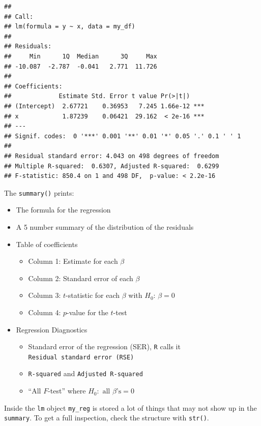 \documentclass[]{book}
\providecommand{\tightlist}{%
  \setlength{\itemsep}{0pt}\setlength{\parskip}{0pt}}
\theoremstyle{definition}
\theoremstyle{definition}
\theoremstyle{definition}
\theoremstyle{remark}
\begin{document}
\begin{verbatim}
## 
## Call:
## lm(formula = y ~ x, data = my_df)
## 
## Residuals:
##     Min      1Q  Median      3Q     Max 
## -10.087  -2.787  -0.041   2.771  11.726 
## 
## Coefficients:
##             Estimate Std. Error t value Pr(>|t|)    
## (Intercept)  2.67721    0.36953   7.245 1.66e-12 ***
## x            1.87239    0.06421  29.162  < 2e-16 ***
## ---
## Signif. codes:  0 '***' 0.001 '**' 0.01 '*' 0.05 '.' 0.1 ' ' 1
## 
## Residual standard error: 4.043 on 498 degrees of freedom
## Multiple R-squared:  0.6307, Adjusted R-squared:  0.6299 
## F-statistic: 850.4 on 1 and 498 DF,  p-value: < 2.2e-16
\end{verbatim}

The \texttt{summary()} prints:

\begin{itemize}
\tightlist
\item
  The formula for the regression
\item
  A 5 number summary of the distribution of the residuals
\item
  Table of coefficients

  \begin{itemize}
  \tightlist
  \item
    Column 1: Estimate for each \(\beta\)
  \item
    Column 2: Standard error of each \(\beta\)
  \item
    Column 3: \(t\)-statistic for each \(\beta\) with
    \(H_0: \, \beta=0\)
  \item
    Column 4: \(p\)-value for the \(t\)-test
  \end{itemize}
\item
  Regression Diagnostics

  \begin{itemize}
  \tightlist
  \item
    Standard error of the regression (SER), \texttt{R} calls it
    \texttt{Residual\ standard\ error\ (RSE)}
  \item
    \texttt{R-squared} and \texttt{Adjusted\ R-squared}
  \item
    ``All \(F\)-test'' where \(H_0: \text{ all } \beta\text{'s}=0\)
  \end{itemize}
\end{itemize}

Inside the \texttt{lm} object \texttt{my\_reg} is stored a lot of things
that may not show up in the \texttt{summary}. To get a full inspection,
check the structure with \texttt{str()}.
\end{document}
